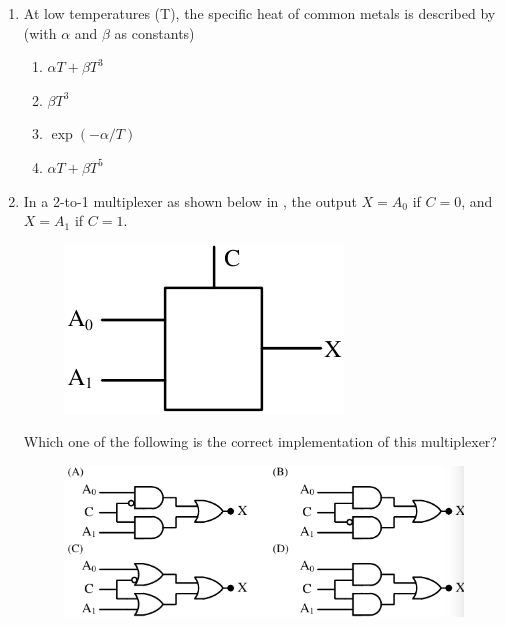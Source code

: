 \documentclass[journal,12pt,onecolumn]{IEEEtran}
\theoremstyle{remark}
\begin{document}
\begin{enumerate}
    \item At low temperatures (T), the specific heat of common metals is described by (with $\alpha$ and $\beta$ as constants)
    \hfill{} \begin{enumerate}
        \item $\alpha T + \beta T^3$
        \item $\beta T^3$
        \item $\exp(-\alpha/T)$
        \item $\alpha T + \beta T^5$
    \end{enumerate}

    \item In a 2-to-1 multiplexer as shown below in , the output $X = A_0$ if $C=0$, and $X = A_1$ if $C=1$.
    \begin{figure}[H]
        \centering
        \caption{} \label{fig:23} \includegraphics{figs/23.png}
    \end{figure}
    Which one of the following is the correct implementation of this multiplexer? \hfill{}
    \begin{figure}[H]
        \centering
\caption*{} \label{fig:23o} \includegraphics{figs/23o.png}
\end{figure}


\end{enumerate}
\end{document}
